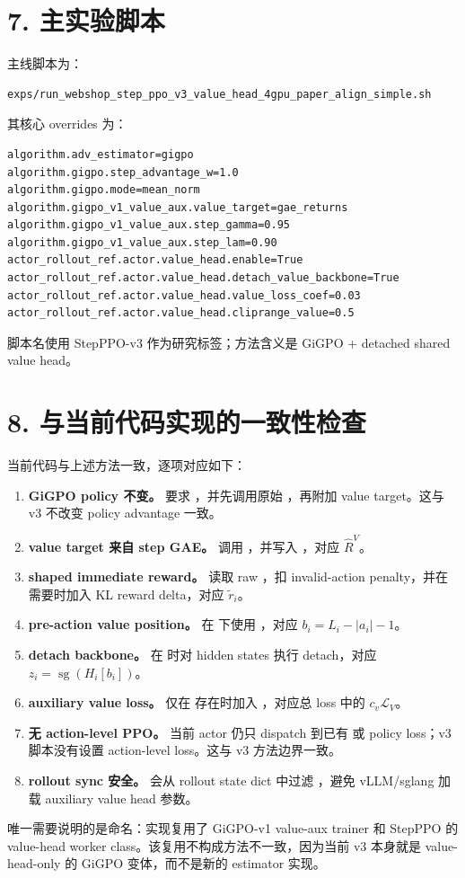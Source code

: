 \documentclass[10pt]{ctexart}
\newcommand{\sg}{\operatorname{sg}}
\begin{document}
\section*{7. 主实验脚本}
主线脚本为：
\begin{lstlisting}
exps/run_webshop_step_ppo_v3_value_head_4gpu_paper_align_simple.sh
\end{lstlisting}
其核心 overrides 为：
\begin{lstlisting}
algorithm.adv_estimator=gigpo
algorithm.gigpo.step_advantage_w=1.0
algorithm.gigpo.mode=mean_norm
algorithm.gigpo_v1_value_aux.value_target=gae_returns
algorithm.gigpo_v1_value_aux.step_gamma=0.95
algorithm.gigpo_v1_value_aux.step_lam=0.90
actor_rollout_ref.actor.value_head.enable=True
actor_rollout_ref.actor.value_head.detach_value_backbone=True
actor_rollout_ref.actor.value_head.value_loss_coef=0.03
actor_rollout_ref.actor.value_head.cliprange_value=0.5
\end{lstlisting}
脚本名使用 StepPPO-v3 作为研究标签；方法含义是 GiGPO + detached shared value head。

\section*{8. 与当前代码实现的一致性检查}
当前代码与上述方法一致，逐项对应如下：
\begin{enumerate}
  \item \textbf{GiGPO policy 不变。}  要求 ，并先调用原始 ，再附加 value target。这与 v3 不改变 policy advantage 一致。
  \item \textbf{value target 来自 step GAE。}  调用 ，并写入 ，对应 \(\widehat R^V\)。
  \item \textbf{shaped immediate reward。}  读取 raw ，扣 invalid-action penalty，并在需要时加入 KL reward delta，对应 \(\tilde r_i\)。
  \item \textbf{pre-action value position。}  在  下使用 ，对应 \(b_i=L_i-|a_i|-1\)。
  \item \textbf{detach backbone。}  在  时对 hidden states 执行 detach，对应 \(z_i=\sg(H_i[b_i])\)。
  \item \textbf{auxiliary value loss。}  仅在  存在时加入 ，对应总 loss 中的 \(c_v\mathcal{L}_V\)。
  \item \textbf{无 action-level PPO。} 当前 actor 仍只 dispatch 到已有  或  policy loss；v3 脚本没有设置 action-level loss。这与 v3 方法边界一致。
  \item \textbf{rollout sync 安全。}  会从 rollout state dict 中过滤 ，避免 vLLM/sglang 加载 auxiliary value head 参数。
\end{enumerate}

唯一需要说明的是命名：实现复用了 GiGPO-v1 value-aux trainer 和 StepPPO 的 value-head worker class。该复用不构成方法不一致，因为当前 v3 本身就是 value-head-only 的 GiGPO 变体，而不是新的 estimator 实现。
\end{document}
